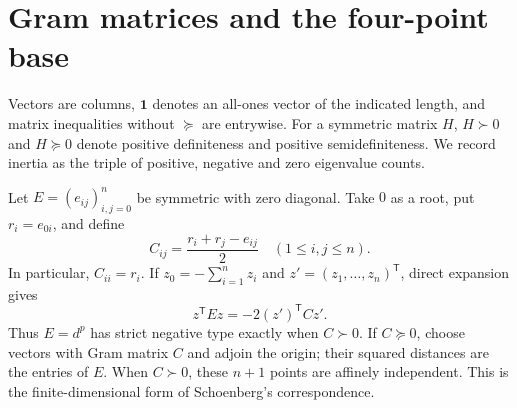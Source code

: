 \documentclass[11pt,a4paper]{article}
\theoremstyle{definition}
\theoremstyle{remark}
\numberwithin{equation}{section}
\newcommand{\one}{\mathbf 1}
\newcommand{\tr}{^{\mathsf T}}
\begin{document}
\section{Gram matrices and the four-point base}\label{sec:gram}
Vectors are columns, $\one$ denotes an all-ones vector of the indicated length, and matrix inequalities without $\succeq$ are entrywise. For a symmetric matrix $H$, $H\succ0$ and $H\succeq0$ denote positive definiteness and positive semidefiniteness. We record inertia as the triple of positive, negative and zero eigenvalue counts.

Let $E=(e_{ij})_{i,j=0}^n$ be symmetric with zero diagonal. Take $0$ as a root, put $r_i=e_{0i}$, and define
\begin{equation}\label{eq:gram}
 C_{ij}=\frac{r_i+r_j-e_{ij}}2\quad(1\le i,j\le n).
\end{equation}
In particular, $C_{ii}=r_i$.
If $z_0=-\sum_{i=1}^nz_i$ and $z'=(z_1,\ldots,z_n)\tr$, direct expansion gives
\begin{equation}\label{eq:gram-identity}
 z\tr Ez=-2(z')\tr Cz'.
\end{equation}
Thus $E=d^p$ has strict negative type exactly when $C\succ0$. If $C\succeq0$, choose vectors with Gram matrix $C$ and adjoin the origin; their squared distances are the entries of $E$. When $C\succ0$, these $n+1$ points are affinely independent. This is the finite-dimensional form of Schoenberg's correspondence.
\end{document}
